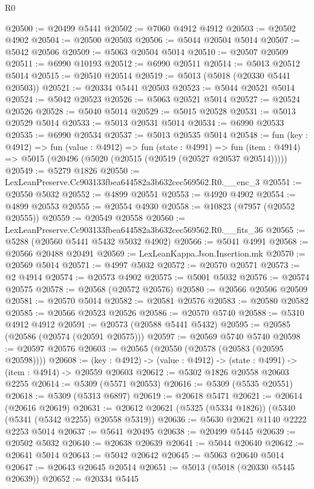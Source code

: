 \begin{lexlean}{R0}
\begin{coremodule}
@20500 := @20499 @5441
@20502 := @7060 @4912 @4912
@20503 := @20502 @4902
@20504 := @20500 @20503
@20506 := @5044 @20504 @5014
@20507 := @5042 @20506
@20509 := @5063 @20504 @5014
@20510 := @20507 @20509
@20511 := @6990 @10193
@20512 := @6990 @20511
@20514 := @5013 @20512 @5014
@20515 := @20510 @20514
@20519 := @5013 (@5018 (@20330 @5441 @20503))
@20521 := @20334 @5441 @20503
@20523 := @5044 @20521 @5014
@20524 := @5042 @20523
@20526 := @5063 @20521 @5014
@20527 := @20524 @20526
@20528 := @5040 @5014
@20529 := @5015 @20528
@20531 := @5013 @20529 @5014
@20533 := @5013 @20531 @5014
@20534 := @6990 @20533
@20535 := @6990 @20534
@20537 := @5013 @20535 @5014
@20548 := fun (key : @4912) =>
  fun (value : @4912) =>
  fun (state : @4991) =>
  fun (item : @4914) => @5015 (@20496 (@5020 (@20515 (@20519 (@20527 @20537 @20514)))))
@20549 := @5279 @1826
@20550 := LexLeanPreserve.Cc903133fbea644582a3b632cec569562.R0.__enc_3
@20551 := @20550 @5032
@20552 := @4899 @20551
@20553 := @4920 @4902
@20554 := @4899 @20553
@20555 := @20554 @4930
@20558 := @10823 (@7957 (@20552 @20555))
@20559 := @20549 @20558
@20560 := LexLeanPreserve.Cc903133fbea644582a3b632cec569562.R0.__fits_36
@20565 := @5288 (@20560 @5441 @5432 @5032 @4902)
@20566 := @5041 @4991
@20568 := @20566 @20488 @20491
@20569 := LexLeanKappa.Json.Insertion.mk
@20570 := @20569 @5014
@20571 := @4997 @5032
@20572 := @20570 @20571
@20573 := @2 @4914
@20574 := @20573 @4902
@20575 := @5001 @5032
@20576 := @20574 @20575
@20578 := @20568 (@20572 @20576)
@20580 := @20566 @20506 @20509
@20581 := @20570 @5014
@20582 := @20581 @20576
@20583 := @20580 @20582
@20585 := @20566 @20523 @20526
@20586 := @20570 @5740
@20588 := @5310 @4912 @4912
@20591 := @20573 (@20588 @5441 @5432)
@20595 := @20585 (@20586 (@20574 (@20591 @20575)))
@20597 := @20569 @5740 @5740
@20598 := @20597 @20576
@20603 := @20565 (@20550 (@20578 (@20583 (@20595 @20598))))
@20608 := (key : @4912) -> (value : @4912) -> (state : @4991) -> (item : @4914) -> @20559 @20603
@20612 := @5302 @1826 @20558 @20603 @2255
@20614 := @5309 (@5571 @20553)
@20616 := @5309 (@5535 @20551)
@20618 := @5309 (@5313 @6897)
@20619 := @20618 @5471
@20621 := @20614 (@20616 @20619)
@20631 := @20612 @20621 (@5325 (@5334 @1826)) (@5340 (@5341 (@5342 @2255) @20558 @5319))
@20636 := @5630 @20621 @1140 @2222 @2253 @5014
@20637 := @5641 @20495
@20638 := @20499 @5445
@20639 := @20502 @5032
@20640 := @20638 @20639
@20641 := @5044 @20640
@20642 := @20641 @5014
@20643 := @5042 @20642
@20645 := @5063 @20640 @5014
@20647 := @20643 @20645 @20514
@20651 := @5013 (@5018 (@20330 @5445 @20639))
@20652 := @20334 @5445

\end{coremodule}
\end{lexlean}
